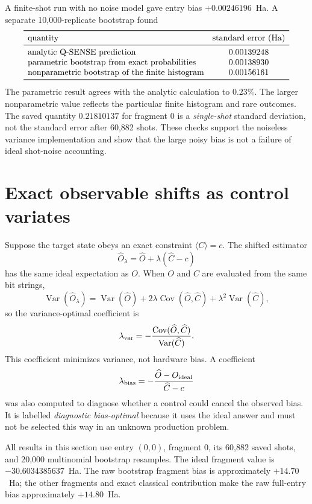 \documentclass[11pt]{article}
\begin{document}
A finite-shot run with no noise model gave entry bias $+0.00246196$~Ha.
A separate 10,000-replicate bootstrap found
\[
\begin{array}{lc}
\toprule
\text{quantity} & \text{standard error (Ha)}\\
\midrule
\text{analytic Q-SENSE prediction} & 0.00139248\\
\text{parametric bootstrap from exact probabilities} & 0.00138930\\
\text{nonparametric bootstrap of the finite histogram} & 0.00156161\\
\bottomrule
\end{array}
\]
The parametric result agrees with the analytic calculation to $0.23\%$.
The larger nonparametric value reflects the particular finite histogram and
rare outcomes.  The saved quantity $0.21810137$ for fragment 0 is a
\emph{single-shot} standard deviation, not the standard error after 60,882
shots.  These checks support the noiseless variance implementation and show
that the large noisy bias is not a failure of ideal shot-noise accounting.

\section{Exact observable shifts as control variates}

Suppose the target state obeys an exact constraint
$\langle C\rangle=c$.  The shifted estimator
\[
  \widehat O_\lambda
  =\widehat O+\lambda(\widehat C-c)
\]
has the same ideal expectation as $O$.  When $O$ and $C$ are evaluated from
the same bit strings,
\[
 \operatorname{Var}(\widehat O_\lambda)
 =\operatorname{Var}(\widehat O)
  +2\lambda\operatorname{Cov}(\widehat O,\widehat C)
  +\lambda^2\operatorname{Var}(\widehat C),
\]
so the variance-optimal coefficient is
\[
 \lambda_{\rm var}=-
 \frac{\operatorname{Cov}(\widehat O,\widehat C)}
      {\operatorname{Var}(\widehat C)}.
\]
This coefficient minimizes variance, not hardware bias.  A coefficient
\[
 \lambda_{\rm bias}=-
 \frac{\widehat O-O_{\rm ideal}}{\widehat C-c}
\]
was also computed to diagnose whether a control could cancel the observed
bias.  It is labelled \emph{diagnostic bias-optimal} because it uses the ideal
answer and must not be selected this way in an unknown production problem.

All results in this section use entry $(0,0)$, fragment 0, its 60,882 saved
shots, and 20,000 multinomial bootstrap resamples.  The ideal fragment value
is $-30.6034385637$~Ha.  The raw bootstrap fragment bias is approximately
$+14.70$~Ha; the other fragments and exact classical contribution make the
raw full-entry bias approximately $+14.80$~Ha.
\end{document}
